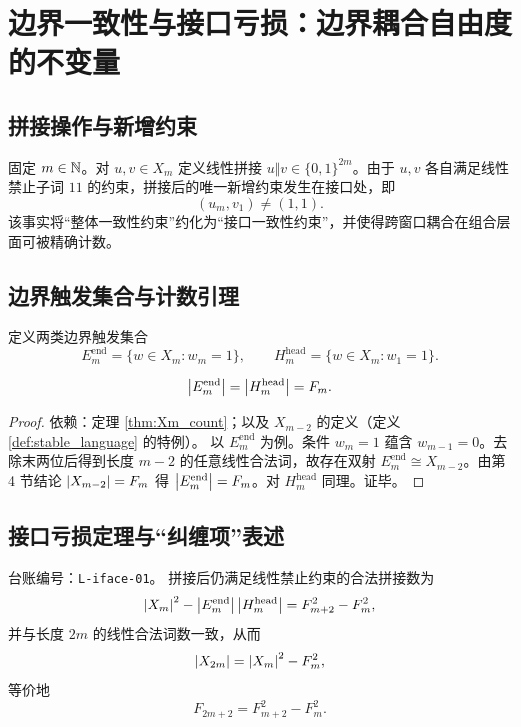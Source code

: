 \section{边界一致性与接口亏损：边界耦合自由度的不变量}

\subsection{拼接操作与新增约束}

固定 $m\in\mathbb{N}$。对 $u,v\in X_m$ 定义线性拼接 $u\Vert v\in\{0,1\}^{2m}$。由于 $u,v$ 各自满足线性禁止子词 $11$ 的约束，拼接后的唯一新增约束发生在接口处，即
$$
(u_m,v_1)\neq(1,1).
$$
该事实将“整体一致性约束”约化为“接口一致性约束”，并使得跨窗口耦合在组合层面可被精确计数。

\subsection{边界触发集合与计数引理}

定义两类边界触发集合
$$
E_m^{\mathrm{end}}=\{w\in X_m:w_m=1\},\qquad H_m^{\mathrm{head}}=\{w\in X_m:w_1=1\}.
$$

\begin{lemma}\label{lem:boundary_trigger_counts}
\MathTag
$$
\left\lvert E_m^{\mathrm{end}}\right\rvert=\left\lvert H_m^{\mathrm{head}}\right\rvert=F_m.
$$
\end{lemma}

\begin{proof}
\MathTag 依赖：定理 \ref{thm:Xm_count}；以及 $X_{m-2}$ 的定义（定义 \ref{def:stable_language} 的特例）。
以 $E_m^{\mathrm{end}}$ 为例。条件 $w_m=1$ 蕴含 $w_{m-1}=0$。去除末两位后得到长度 $m-2$ 的任意线性合法词，故存在双射 $E_m^{\mathrm{end}}\cong X_{m-2}$。由第 4 节结论 $\left\lvert X_{m-2}\right\rvert=F_m$ 得 $\left\lvert E_m^{\mathrm{end}}\right\rvert=F_m$。对 $H_m^{\mathrm{head}}$ 同理。证毕。
\end{proof}

\subsection{接口亏损定理与“纠缠项”表述}

\begin{theorem}[接口亏损定理]\label{thm:interface_loss}
\MathTag
\AuditTag 台账编号：\texttt{L-iface-01}。
拼接后仍满足线性禁止约束的合法拼接数为
$$
\left\lvert X_m\right\rvert^2-\left\lvert E_m^{\mathrm{end}}\right\rvert\left\lvert H_m^{\mathrm{head}}\right\rvert
=F_{m+2}^2-F_m^2,
$$
并与长度 $2m$ 的线性合法词数一致，从而
$$
\left\lvert X_{2m}\right\rvert=\left\lvert X_m\right\rvert^2-F_m^2,
$$
等价地
$$
F_{2m+2}=F_{m+2}^2-F_m^2.
$$
\end{theorem}

